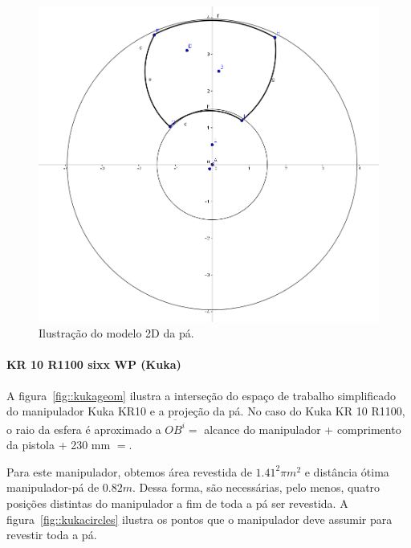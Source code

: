 \begin{figure}[h!]	
	\includegraphics[width=\columnwidth]{detail/figs/bighatch/pa2D.png}
	\caption{Ilustração do modelo 2D da pá.}
	\label{fig::pa2D}
\end{figure}

\paragraph{KR 10 R1100 sixx WP (Kuka)}
A figura~\ref{fig::kukageom} ilustra a interseção do espaço de trabalho
simplificado do manipulador Kuka KR10 e a projeção da pá. No
caso do Kuka KR 10 R1100, o raio da esfera é aproximado a $\overline{OB^i} = $
alcance do manipulador + comprimento da pistola + 230 mm $= $. 

Para este manipulador, obtemos área revestida de $1.41^2\pi m^2$ e distância
ótima manipulador-pá de $0.82 m$. Dessa forma, são necessárias, pelo menos,
quatro posições distintas do manipulador a fim de toda a pá ser revestida. A
figura~\ref{fig::kukacircles} ilustra os pontos que o manipulador deve assumir
para revestir toda a pá. 

